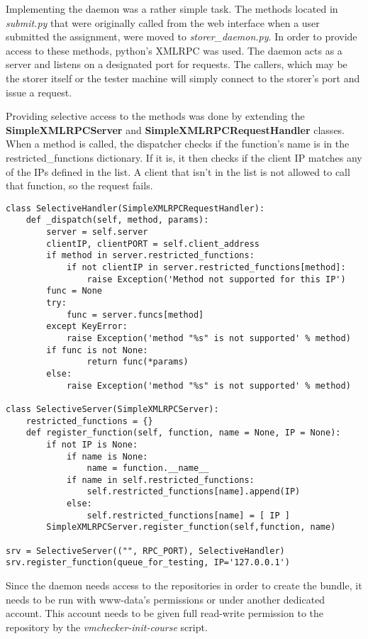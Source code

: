 Implementing the daemon was a rather simple task. The methods located in 
\textit{submit.py} that were originally called from the web interface when
a user submitted the assignment, were moved to \textit{storer_daemon.py}.
In order to provide access to these methods, python's XMLRPC was used.
The daemon acts as a server and listens on a designated port for requests.
The callers, which may be the storer itself or the tester machine will
simply connect to the storer's port and issue a request.

Providing selective access to the methods was done by extending the
\textbf{SimpleXMLRPCServer} and \textbf{SimpleXMLRPCRequestHandler} classes.
When a method is called, the dispatcher checks if the function's name is 
in the restricted_functions dictionary. If it is, it then checks if the
client IP matches any of the IPs defined in the list. A client that isn't
in the list is not allowed to call that function, so the request fails.


\lstset{caption=SelectiveServer implementation, language=python, label=lst:selective-srv}
\begin{lstlisting}
class SelectiveHandler(SimpleXMLRPCRequestHandler):
    def _dispatch(self, method, params):
        server = self.server
        clientIP, clientPORT = self.client_address
        if method in server.restricted_functions:
            if not clientIP in server.restricted_functions[method]:
                raise Exception('Method not supported for this IP')
        func = None
        try:
            func = server.funcs[method]
        except KeyError:
            raise Exception('method "%s" is not supported' % method)
        if func is not None:
                return func(*params)
        else:
            raise Exception('method "%s" is not supported' % method)            
        
class SelectiveServer(SimpleXMLRPCServer):
    restricted_functions = {}
    def register_function(self, function, name = None, IP = None):
        if not IP is None:
            if name is None:
                name = function.__name__
            if name in self.restricted_functions:
                self.restricted_functions[name].append(IP)
            else:
                self.restricted_functions[name] = [ IP ]
        SimpleXMLRPCServer.register_function(self,function, name)
        
srv = SelectiveServer(("", RPC_PORT), SelectiveHandler)
srv.register_function(queue_for_testing, IP='127.0.0.1')
\end{lstlisting}

Since the daemon needs access to the repositories in order to create the bundle,
it needs to be run with www-data's permissions or under another dedicated account.
This account needs to be given full read-write permission to the repository
by the \textit{vmchecker-init-course} script.



